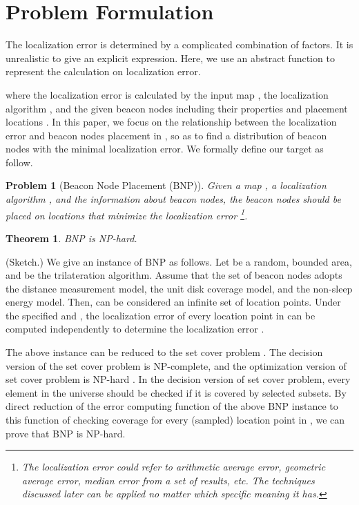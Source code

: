 \documentclass[10pt, conference, letterpaper]{IEEEtran}
\newtheorem{thm}{Theorem}
\newtheorem{prob}{Problem}
\begin{document}
\section{Problem Formulation} \label{formulation}

The localization error is determined by a complicated combination of factors. It is unrealistic to give an explicit expression. Here, we use an abstract function to represent the calculation on localization error.

where the localization error  is calculated by the input map , the localization algorithm , and the given beacon nodes  including their properties  and placement locations . In this paper, we focus on the relationship between the localization error  and beacon nodes placement  in , so as to find a distribution of beacon nodes with the minimal localization error. We formally define our target as follow.

\begin{prob} [Beacon Node Placement (BNP)]
Given a map , a localization algorithm , and the information  about beacon nodes, the beacon nodes should be placed on locations  that minimize the localization error \footnote{The localization error  could refer to arithmetic average error, geometric average error, median error from a set of results, etc. The techniques discussed later can be applied no matter which specific meaning it has.}.
\end{prob}

\begin{thm}
BNP is NP-hard.
\end{thm}
\begin{IEEEproof}
(Sketch.) We give an instance of BNP as follows. Let  be a random, bounded area, and  be the trilateration algorithm. Assume that the set  of beacon nodes adopts the distance measurement model, the unit disk coverage model, and the non-sleep energy model. Then,  can be considered an infinite set  of location points. Under the specified  and , the localization error of every location point in  can be computed independently to determine the localization error .

The above instance can be reduced to the set cover problem \cite{karp72}. The decision version of the set cover problem is NP-complete, and the optimization version of set cover problem is NP-hard \cite{korte12}. In the decision version of set cover problem, every element in the universe should be checked if it is covered by selected subsets. By direct reduction of the error computing function of the above BNP instance to this function of checking coverage for every (sampled) location point in , we can prove that BNP is NP-hard.
\end{IEEEproof}
\end{document}
